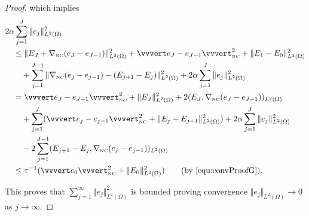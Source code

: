 \begin{proof}
  \noindent which implies
  \begin{align*}
    &2\alpha\sum_{j=1}^J\Vert e_j\Vert^2_{L^2(\Omega)} \\
    &\quad\leq
    \Vert E_J + \gradnc(e_J-e_{J-1}) \Vert_{L^2(\Omega)}^2 
    + \vvvert e_J-e_{J-1} \vvvert^2_\nc 
    + \Vert E_1 - E_0 \Vert^2_{L^2(\Omega)} \\
    &\quad\quad 
    + \sum_{j=1}^{J-1}  
      \Vert \gradnc(e_j-e_{j-1}) - (E_{j+1} - E_j ) \Vert^2_{L^2(\Omega)} 
    + 2\alpha\sum_{j=1}^J\Vert e_j\Vert^2_{L^2(\Omega)}\\
    &\quad = 
    \vvvert e_J - e_{J-1} \vvvert^2_\nc + \Vert E_J \Vert_{L^2(\Omega)}^2 
    + 2(E_{J},\gradnc(e_J-e_{J-1}))_{L^2(\Omega)} \\
    &\quad\quad 
    + \sum_{j=1}^J ( \vvvert e_j-e_{j-1} \vvvert^2_\nc
    + \Vert E_j - E_{j-1} \Vert^2_{L^2(\Omega)} )
    + 2\alpha\sum_{j=1}^J\Vert e_j\Vert^2_{L^2(\Omega)}\\
    &\quad\quad 
    - 2\sum_{j=1}^{J-1}(E_{j+1}-E_j,\gradnc(e_j-e_{j-1}))_{L^2(\Omega)}\\
    &\quad\leq
    \tau^{-1}(\vvvert e_0\vvvert^2_\nc + \Vert E_0\Vert^2_{L^2(\Omega)})
    \tag{by \eqref{equ:convProofG}}.
  \end{align*}

  \noindent This proves that 
  $\sum_{j=1}^\infty \Vert e_j\Vert _{L^2(\Omega)}^2$ is bounded
  proving convergence $\Vert e_j\Vert_{L^2(\Omega)}\rightarrow 0$
  as $j\rightarrow \infty$.
\end{proof}

